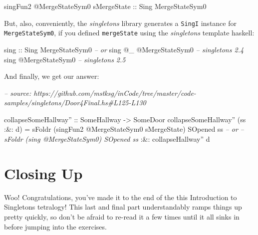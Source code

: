 \documentclass[]{article}
\newenvironment{Shaded}{}{}
\newcommand{\CommentTok}[1]{\textcolor[rgb]{0.38,0.63,0.69}{\textit{#1}}}
\newcommand{\DataTypeTok}[1]{\textcolor[rgb]{0.56,0.13,0.00}{#1}}
\newcommand{\FunctionTok}[1]{\textcolor[rgb]{0.02,0.16,0.49}{#1}}
\newcommand{\NormalTok}[1]{#1}
\newcommand{\OtherTok}[1]{\textcolor[rgb]{0.00,0.44,0.13}{#1}}
\begin{document}
\begin{Shaded}
\begin{Highlighting}[]
\NormalTok{singFun2 }\FunctionTok{@}\DataTypeTok{MergeStateSym0}\NormalTok{ sMergeState}
\OtherTok{    ::} \DataTypeTok{Sing} \DataTypeTok{MergeStateSym0}
\end{Highlighting}
\end{Shaded}

But, also, conveniently, the \emph{singletons} library generates a
\texttt{SingI} instance for \texttt{MergeStateSym0}, if you defined
\texttt{mergeState} using the \emph{singletons} template haskell:

\begin{Shaded}
\begin{Highlighting}[]
\OtherTok{sing ::} \DataTypeTok{Sing} \DataTypeTok{MergeStateSym0}
\CommentTok{-- or}
\NormalTok{sing }\FunctionTok{@}\NormalTok{_ }\FunctionTok{@}\DataTypeTok{MergeStateSym0}         \CommentTok{-- singletons 2.4}
\NormalTok{sing }\FunctionTok{@}\DataTypeTok{MergeStateSym0}            \CommentTok{-- singletons 2.5}
\end{Highlighting}
\end{Shaded}

And finally, we get our answer:

\begin{Shaded}
\begin{Highlighting}[]
\CommentTok{-- source: https://github.com/mstksg/inCode/tree/master/code-samples/singletons/Door4Final.hs#L125-L130}

\OtherTok{collapseSomeHallway'' ::} \DataTypeTok{SomeHallway} \OtherTok{->} \DataTypeTok{SomeDoor}
\NormalTok{collapseSomeHallway'' (ss }\FunctionTok{:&:}\NormalTok{ d) }\FunctionTok{=}
\NormalTok{        sFoldr (singFun2 }\FunctionTok{@}\DataTypeTok{MergeStateSym0}\NormalTok{ sMergeState) }\DataTypeTok{SOpened}\NormalTok{ ss}
     \CommentTok{-- or}
     \CommentTok{-- sFoldr (sing @MergeStateSym0) SOpened ss}
    \FunctionTok{:&:}\NormalTok{ collapseHallway'' d}
\end{Highlighting}
\end{Shaded}

\hypertarget{closing-up}{%
\section{Closing Up}\label{closing-up}}

Woo! Congratulations, you've made it to the end of the this Introduction to
Singletons tetralogy! This last and final part understandably ramps things up
pretty quickly, so don't be afraid to re-read it a few times until it all sinks
in before jumping into the exercises.
\end{document}
